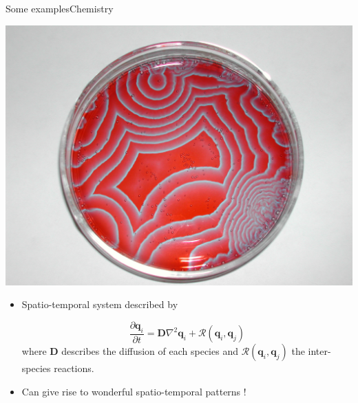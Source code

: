 \documentclass[usenames,dvipsnames,svgnames,10pt,aspectratio=169]{beamer}
\begin{document}
\begin{frame}[t, c]{Some examples}{Chemistry}
  \begin{minipage}{.38\textwidth}
    \centering
    \includegraphics[width=\textwidth]{BZ_reaction}
  \end{minipage}%
  \hfill
  \begin{minipage}{.58\textwidth}
    \begin{itemize}
    \item Spatio-temporal system described by
      
      \[
      \dfrac{\partial \bm{q}_i}{\partial t} = \bm{D} \nabla^2 \bm{q}_i + \mathcal{R}(\bm{q}_i, \bm{q}_j)
      \]
      where $\bm{D}$ describes the diffusion of each species and $\mathcal{R}(\bm{q}_i, \bm{q}_j)$ the inter-species reactions.

      \bigskip

    \item Can give rise to wonderful spatio-temporal patterns !
    \end{itemize}
  \end{minipage}

  \vspace{1cm}
\end{frame}
\end{document}
